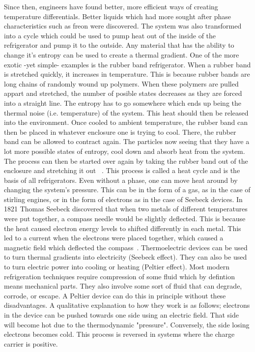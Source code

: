 	Since then, engineers have found better, more efficient ways of creating temperature differentials. Better liquids which had more sought after phase characteristics such as freon were discovered. The system was also transformed into a cycle which could be used to pump heat out of the inside of the refrigerator and pump it to the outside. Any material that has the ability to change it's entropy can be used to create a thermal gradient. One of the more exotic -yet simple- examples is the rubber band refrigerator. When a rubber band is stretched quickly, it increases in temperature. This is because rubber bands are long chains of randomly wound up polymers. When these polymers are pulled appart and stretched, the number of posible states decreases as they are forced into a straight line. The entropy has to go somewhere which ends up being the thermal noise (i.e. temperature) of the system. This heat should then be released into the environment. Once cooled to ambient temperature, the rubber band can then be placed in whatever enclosure one is trying to cool. There, the rubber band can be allowed to contract again. The particles now seeing that they have a lot more possible states of entropy, cool down and absorb heat from the system. The process can then be started over again by taking the rubber band out of the enclosure and stretching it out ~\cite{Brown63}. This process is called a heat cycle and is the basis of all refrigerators. Even without a phase, one can move heat around by changing the system's pressure. This can be in the form of a gas, as in the case of stirling engines, or in the form of electrons as in the case of Seebeck devices. 
	In 1821 Thomas Seebeck discovered that when two metals of different temperatures were put together, a compass needle would be slightly deflected. This is because the heat caused electron energy levels to shifted differently in each metal. This led to a current when the electrons were placed together, which caused a magnetic field which deflected the compass~\cite{Dommelen13}. Thermoelectric devices can be used to turn thermal gradients into electricity (Seebeck effect). They can also be used to turn electric power into cooling or heating (Peltier effect). Most modern refrigeration techniques require compression of some fluid which by defintion means mechanical parts. They also involve some sort of fluid that can degrade, corrode, or escape. A Peltier device can do this in principle without these disadvantages. A qualitative explanation to how they work is as follows; electrons in the device can be pushed towards one side using an electric field. That side will become hot due to the thermodynamic "pressure". Conversely, the side losing electrons becomes cold. This process is reversed in systems where the charge carrier is positive.

